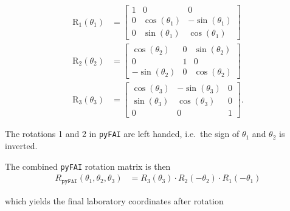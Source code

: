 \documentclass[12pt]{article}
\begin{document}
\begin{align}
  \mathrm{R}_1(\theta_1)
  & =
  \begin{bmatrix}
    1 & 0 & 0 \\
    0 & \cos(\theta_1) & -\sin(\theta_1) \\
    0 & \sin(\theta_1) & \cos(\theta_1)
  \end{bmatrix}
  \label{eq-rot1}
  \\
  \mathrm{R}_2(\theta_2)
  & =
  \begin{bmatrix}
    \cos(\theta_2) & 0 & \sin(\theta_2) \\
    0 & 1 & 0 \\
    -\sin(\theta_2) & 0 & \cos(\theta_2)
  \end{bmatrix}
  \label{eq-rot2}
  \\
  \mathrm{R}_3(\theta_3)
  & =
  \begin{bmatrix}
    \cos(\theta_3) & -\sin(\theta_3) & 0\\
    \sin(\theta_3) & \cos(\theta_3) & 0\\
    0 & 0 & 1  
  \end{bmatrix}.
  \label{eq-rot3}
\end{align}

The rotations 1 and 2 in \texttt{pyFAI} are left handed, i.e.~the sign
of $\theta_1$ and $\theta_2$ is inverted. 

The combined \texttt{pyFAI} rotation matrix is then
\begin{align}
  R_{\mathtt{pyFAI}}(\theta_1, \theta_2, \theta_3)
  & =
  R_3(\theta_3) \cdot R_2(-\theta_2) \cdot R_1(-\theta_1)
\end{align}

which yields the final  laboratory coordinates after rotation
\end{document}
